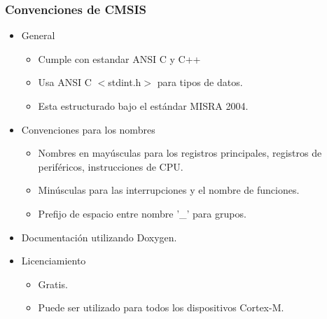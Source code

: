 \documentclass[10.5pt,scale=1.0,t,aspectratio=169,hyperref={pdfpagelabels=false}]{beamer}
\begin{document}
\begin{frame}
	\frametitle{Convenciones de CMSIS}
	\begin{itemize}
		\item General
		\begin{itemize}
			\item Cumple con estandar ANSI C y C++
			\item Usa ANSI C $<$stdint.h$>$ para tipos de datos.
			\item Esta estructurado bajo el estándar MISRA 2004.
		\end{itemize}
		\item Convenciones para los nombres
		\begin{itemize}
			\item Nombres en mayúsculas para los registros principales, registros de periféricos, instrucciones de CPU.
			\item Minúsculas para las interrupciones y el nombre de funciones.
			\item Prefijo de espacio entre nombre '\_' para grupos.
		\end{itemize}
		\item Documentación utilizando Doxygen.
		\item Licenciamiento
		\begin{itemize}
			\item Gratis.
			\item Puede ser utilizado para todos los dispositivos Cortex-M.
		\end{itemize}
	\end{itemize}
\end{frame}
\end{document}
